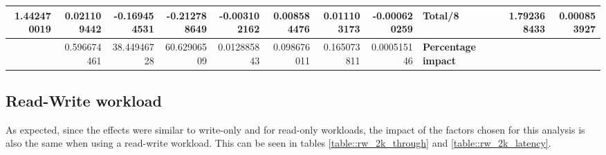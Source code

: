 \documentclass[11pt,a4paper]{article}
\begin{document}
{\begin{landscape}
{\begin{tabular}{|*{15}{r|}}
                \hline 1.442470019 & 0.021109442 & -0.169454531 & -0.212788649 & -0.003102162 & 0.008584476 & 0.011103173 & -0.000620259 & \multicolumn{3}{|l|}{\textbf{Total/8}} & \multicolumn{2}{|r|}{} & 1.792368433 & 0.000853927 \\
                \hline & 0.596674461 & 38.44946728 & 60.62906509 & 0.012885843 & 0.098676011 & 0.165073811 & 0.000515146 & \multicolumn{3}{|l|}{\textbf{Percentage impact}} & \multicolumn{4}{|l|}{} \\
                \hline
            \end{tabular}
        }
        \label{table::wo_2k_latency}

    \end{landscape}
    \clearpage%
}


\subsection{Read-Write workload}
As expected, since the effects were similar to write-only and for read-only workloads, the impact of the factors chosen for this analysis is also the same when using a read-write workload. This can be seen in tables \ref{table::rw_2k_through} and \ref{table::rw_2k_latency}.
\end{document}
